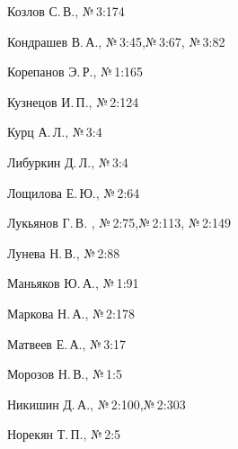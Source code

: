 \begin{theindex}
\item Козлов С.\,В., №\,3:174


\item Кондрашев В.\,А., №\,3:45,\newline  №\,3:67, №\,3:82


\item Корепанов Э.\,Р., №\,1:165


\item Кузнецов И.\,П., №\,2:124


\item Курц А.\,Л., №\,3:4





  \indexspace





\item Либуркин Д.\,Л., №\,3:4


\item Лощилова Е.\,Ю., №\,2:64


\item Лукьянов Г.\,В. , №\,2:75,\newline  №\,2:113, №\,2:149


\item Лунева Н.\,В., №\,2:88





  \indexspace





\item Маньяков Ю.\,А., №\,1:91


\item Маркова Н.\,А., №\,2:178


\item Матвеев Е.\,А., №\,3:17


\item Морозов Н.\,В., №\,1:5





  \indexspace





\item Никишин Д.\,А., №\,2:100,\newline  №\,2:303


\item Норекян Т.\,П., №\,2:5






\end{theindex}
